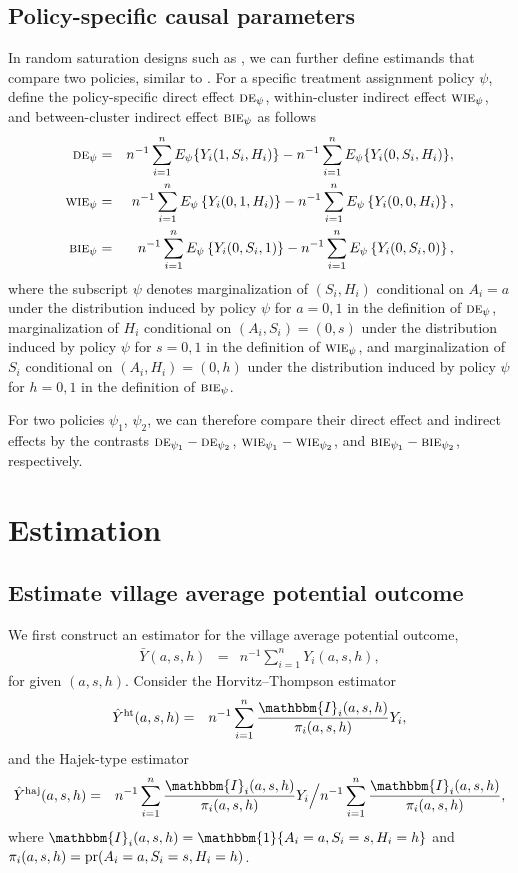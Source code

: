 \documentclass{article}
\newcommand{\pr}{\textup{pr}}
\newcommand{\sumi}{\sum_{i=1}^n}
\newcommand{\de}{\textsc{de}}
\newcommand{\bie}{\textsc{bie}}
\newcommand{\wie}{\textsc{wie}}
\newcommand{\horthom}{\textup{ht}}
\newcommand{\haj}{\textup{haj}}
\newcommand{\indicator}{\mathbbm{1}}
\newcommand{\bbI}{\mathbbm{I}}
\newcommand{\pscore}[1]{\pi_{#1}}
\begin{document}
\subsection{Policy-specific causal parameters}
In random saturation designs such as \cite{egger2022general}, we can further define estimands that compare two policies, similar to \citep{hudgens2008toward}. For a specific treatment assignment policy $\psi$, define the policy-specific direct effect $\de_{\psi}$, within-cluster indirect effect $\wie_{\psi}$, and between-cluster indirect effect $\bie_{\psi}$ as follows
\begin{eqnarray*}
    \de_{\psi} &=& n^{-1}\sumi E_{\psi}\{Y_i(1,S_i,H_i)\} - n^{-1}\sumi E_{\psi}\{Y_i(0,S_i,H_i)\}, \\
    \wie_{\psi} &=& n^{-1}\sumi E_{\psi}\left\{Y_{i}(0,1,H_{i})\right\} - n^{-1}\sumi E_{\psi}\left\{Y_{i}(0,0,H_{i})\right\}, \\
    \bie_{\psi} &=& n^{-1}\sumi E_{\psi}\left\{Y_{i}(0,S_{i},1)\right\} - n^{-1}\sumi E_{\psi}\left\{Y_{i}(0,S_{i},0)\right\},
\end{eqnarray*}
where the subscript $\psi$ denotes marginalization of $(S_{i}, H_{i})$ conditional on $A_{i} = a$ under the distribution induced by policy $\psi$ for $a=0,1$ in the definition of $\de_{\psi}$, marginalization of $H_{i}$ conditional on $(A_{i},S_{i}) = (0,s)$ under the distribution induced by policy $\psi$ for $s=0,1$ in the definition of $\wie_{\psi}$, and marginalization of $S_{i}$ conditional on $(A_{i},H_{i}) = (0,h)$ under the distribution induced by policy $\psi$ for $h=0,1$ in the definition of $\bie_{\psi}$.

For two policies $\psi_1$, $\psi_2$, we can therefore compare their direct effect and indirect effects by the contrasts $\de_{\psi_1} - \de_{\psi_2}$, $\wie_{\psi_1} - \wie_{\psi_2}$, and $\bie_{\psi_1} - \bie_{\psi_2}$, respectively.

\section{Estimation}
\label{sec::estimation}

\subsection{Estimate village average potential outcome}
We first construct an estimator for the village average potential outcome,
\begin{eqnarray*}
    \bar{Y}(a,s,h) &=& n^{-1}\sumi Y_{i}(a,s,h),
\end{eqnarray*}
for given $(a,s,h)$. Consider the Horvitz--Thompson estimator
\begin{eqnarray*}
    \hat{Y}^{\horthom}(a,s,h) &=& n^{-1}\sumi\frac{ \bbI_{i}(a,s,h)}{ \pscore{i}(a,s,h)}Y_{i},
\end{eqnarray*}
and the Hajek-type estimator
\begin{eqnarray*}
    \hat{Y}^{\haj}(a,s,h) &=& n^{-1}\sumi\frac{ \bbI_{i}(a,s,h) }{ \pscore{i}(a,s,h)}Y_{i} \Big / n^{-1}\sumi\frac{ \bbI_{i}(a,s,h)}{ \pscore{i}(a,s,h)},
\end{eqnarray*}
where $\bbI_{i}(a,s,h)=\indicator\{A_{i}=a,S_{i}=s,H_{i}=h\}$ and $\pscore{i}(a,s,h)=\pr(A_{i}=a, S_{i}=s, H_{i}=h)$.
\end{document}
